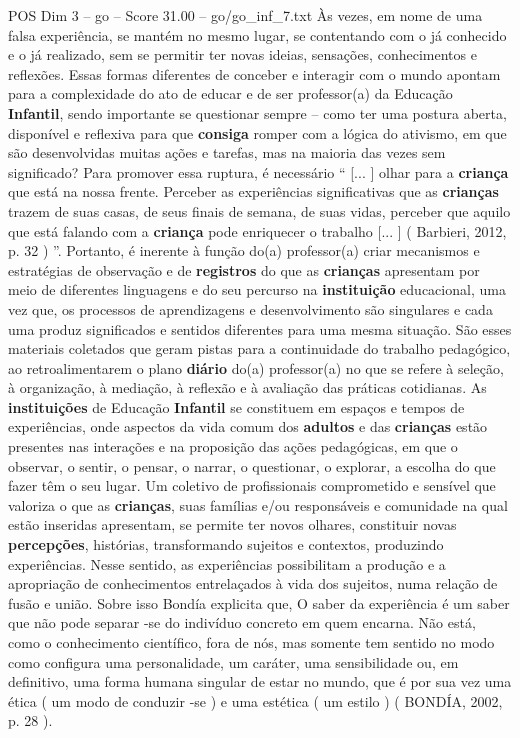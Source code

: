 \begin{textsample}{POS Dim 3 – go – Score 31.00 – go/go\_inf\_7.txt}
Às vezes, em nome de uma falsa experiência, se mantém no mesmo lugar, se contentando com o já conhecido e o já realizado, sem se permitir ter novas ideias, sensações, conhecimentos e reflexões.
Essas formas diferentes de conceber e interagir com o mundo apontam para a complexidade do ato de educar e de ser professor(a) da Educação \textbf{Infantil}, sendo importante se questionar sempre – como ter uma postura aberta, disponível e reflexiva para que \textbf{consiga} romper com a lógica do ativismo, em que são desenvolvidas muitas ações e tarefas, mas na maioria das vezes sem significado?
Para promover essa ruptura, é necessário “ [... ] olhar para a \textbf{criança} que está na nossa frente.
Perceber as experiências significativas que as \textbf{crianças} trazem de suas casas, de seus finais de semana, de suas vidas, perceber que aquilo que está falando com a \textbf{criança} pode enriquecer o trabalho [... ] ( Barbieri, 2012, p. 32 ) ”.
Portanto, é inerente à função do(a) professor(a) criar mecanismos e estratégias de observação e de \textbf{registros} do que as \textbf{crianças} apresentam por meio de diferentes linguagens e do seu percurso na \textbf{instituição} educacional, uma vez que, os processos de aprendizagens e desenvolvimento são singulares e cada uma produz significados e sentidos diferentes para uma mesma situação.
São esses materiais coletados que geram pistas para a continuidade do trabalho pedagógico, ao retroalimentarem o plano \textbf{diário} do(a) professor(a) no que se refere à seleção, à organização, à mediação, à reflexão e à avaliação das práticas cotidianas.
As \textbf{instituições} de Educação \textbf{Infantil} se constituem em espaços e tempos de experiências, onde aspectos da vida comum dos \textbf{adultos} e das \textbf{crianças} estão presentes nas interações e na proposição das ações pedagógicas, em que o observar, o sentir, o pensar, o narrar, o questionar, o explorar, a escolha do que fazer têm o seu lugar.
Um coletivo de profissionais comprometido e sensível que valoriza o que as \textbf{crianças}, suas famílias e/ou responsáveis e comunidade na qual estão inseridas apresentam, se permite ter novos olhares, constituir novas \textbf{percepções}, histórias, transformando sujeitos e contextos, produzindo experiências.
Nesse sentido, as experiências possibilitam a produção e a apropriação de conhecimentos entrelaçados à vida dos sujeitos, numa relação de fusão e união.
Sobre isso Bondía explicita que, O saber da experiência é um saber que não pode separar -se do indivíduo concreto em quem encarna.
Não está, como o conhecimento científico, fora de nós, mas somente tem sentido no modo como configura uma personalidade, um caráter, uma sensibilidade ou, em definitivo, uma forma humana singular de estar no mundo, que é por sua vez uma ética ( um modo de conduzir -se ) e uma estética ( um estilo ) ( BONDÍA, 2002, p. 28 ).

\end{textsample}
